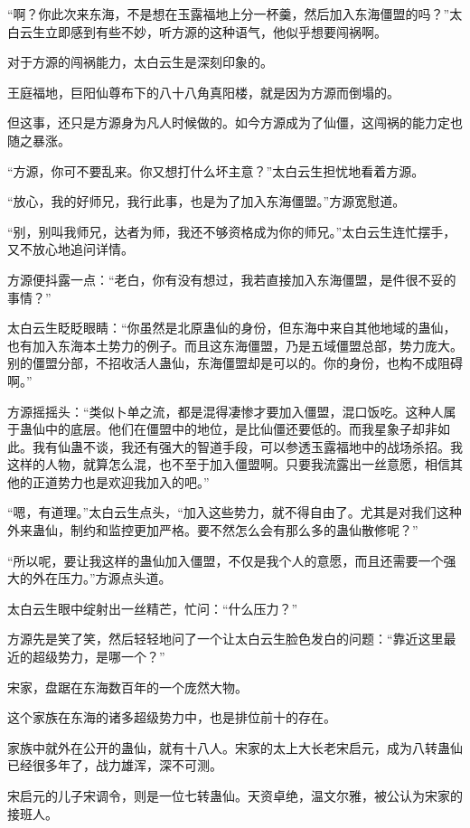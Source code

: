 \begin{this_body}
“啊？你此次来东海，不是想在玉露福地上分一杯羹，然后加入东海僵盟的吗？”太白云生立即感到有些不妙，听方源的这种语气，他似乎想要闯祸啊。

对于方源的闯祸能力，太白云生是深刻印象的。

王庭福地，巨阳仙尊布下的八十八角真阳楼，就是因为方源而倒塌的。

但这事，还只是方源身为凡人时候做的。如今方源成为了仙僵，这闯祸的能力定也随之暴涨。

“方源，你可不要乱来。你又想打什么坏主意？”太白云生担忧地看着方源。

“放心，我的好师兄，我行此事，也是为了加入东海僵盟。”方源宽慰道。

“别，别叫我师兄，达者为师，我还不够资格成为你的师兄。”太白云生连忙摆手，又不放心地追问详情。

方源便抖露一点：“老白，你有没有想过，我若直接加入东海僵盟，是件很不妥的事情？”

太白云生眨眨眼睛：“你虽然是北原蛊仙的身份，但东海中来自其他地域的蛊仙，也有加入东海本土势力的例子。而且这东海僵盟，乃是五域僵盟总部，势力庞大。别的僵盟分部，不招收活人蛊仙，东海僵盟却是可以的。你的身份，也构不成阻碍啊。”

方源摇摇头：“类似卜单之流，都是混得凄惨才要加入僵盟，混口饭吃。这种人属于蛊仙中的底层。他们在僵盟中的地位，是比仙僵还要低的。而我星象子却非如此。我有仙蛊不谈，我还有强大的智道手段，可以参透玉露福地中的战场杀招。我这样的人物，就算怎么混，也不至于加入僵盟啊。只要我流露出一丝意愿，相信其他的正道势力也是欢迎我加入的吧。”

“嗯，有道理。”太白云生点头，“加入这些势力，就不得自由了。尤其是对我们这种外来蛊仙，制约和监控更加严格。要不然怎么会有那么多的蛊仙散修呢？”

“所以呢，要让我这样的蛊仙加入僵盟，不仅是我个人的意愿，而且还需要一个强大的外在压力。”方源点头道。

太白云生眼中绽射出一丝精芒，忙问：“什么压力？”

方源先是笑了笑，然后轻轻地问了一个让太白云生脸色发白的问题：“靠近这里最近的超级势力，是哪一个？”

宋家，盘踞在东海数百年的一个庞然大物。

这个家族在东海的诸多超级势力中，也是排位前十的存在。

家族中就外在公开的蛊仙，就有十八人。宋家的太上大长老宋启元，成为八转蛊仙已经很多年了，战力雄浑，深不可测。

宋启元的儿子宋调令，则是一位七转蛊仙。天资卓绝，温文尔雅，被公认为宋家的接班人。


\end{this_body}
